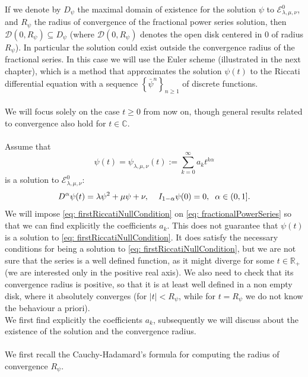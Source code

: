 \documentclass[a4paper,italian,11pt]{book}
\theoremstyle{plain}
\theoremstyle{remark}
\theoremstyle{plain}
\begin{document}
If we denote by $D_\psi$ the maximal domain of existence for the solution $\psi$ to $\mathcal{E} ^ 0 _ {\lambda, \mu ,\nu}$, and $R_\psi$ the radius of convergence of the fractional power series solution, then $\mathcal{D}(0,R_\psi) \subseteq D_\psi$ (where $\mathcal{D}(0,R_\psi)$ denotes the open disk centered in $0$ of radius $R_\psi$).
In particular the solution could exist outside the convergence radius of the fractional series. 
In this case we will use the Euler scheme (illustrated in the next chapter), which is a method that approximates the solution $\psi(t)$ to the Riccati differential equation with a sequence $\left\{ \bar{\psi}^n \right\}_{n\ge 1}$ of discrete functions.
\\
\\
We will focus solely on the case $t\ge 0$ from now on, though general results related to convergence also hold for $t\in \mathbb{C}$.
\\
\\
Assume that 
\begin{equation}
    \label{eq: fractionalPowerSeries}
    \psi(t) = \psi_{\lambda ,\mu , \nu}(t) := \sum_{k = 0}^\infty a_k t^{k\alpha}
\end{equation}
is a solution to $\mathcal{E} ^ 0 _ {\lambda, \mu ,\nu}$: 
\begin{equation}
    \label{eq: firstRiccatiNullCondition}
    D^\alpha \psi (t) = \lambda \psi^2 + \mu \psi + \nu, \hspace{0.4cm} I_{1-\alpha}\psi(0) = 0, \hspace{0.2cm} \alpha \in (0,1].
\end{equation}
We will impose \eqref{eq: firstRiccatiNullCondition} on \eqref{eq: fractionalPowerSeries} so that we can find explicitly the coefficients $a_k$. 
This does not guarantee that $\psi(t)$ is a solution to \eqref{eq: firstRiccatiNullCondition}.
It does satisfy the necessary conditions for being a solution to \eqref{eq: firstRiccatiNullCondition}, but we are not sure that the series is a well defined function, as it might diverge for some $t \in \mathbb{R}_+$ (we are interested only in the positive real axis). 
We also need to check that its convergence radius is positive, so that it is at least well defined in a non empty disk, where it absolutely converges (for $|t|<R_\psi$, while for $t=R_\psi$ we do not know the behaviour a priori).
\\
We first find explicitly the coefficients $a_k$, subsequently we will discuss about the existence of the solution and the convergence radius.
\\\
\\
We first recall the Cauchy-Hadamard's formula for computing the radius of convergence $R_\psi$.
\end{document}
